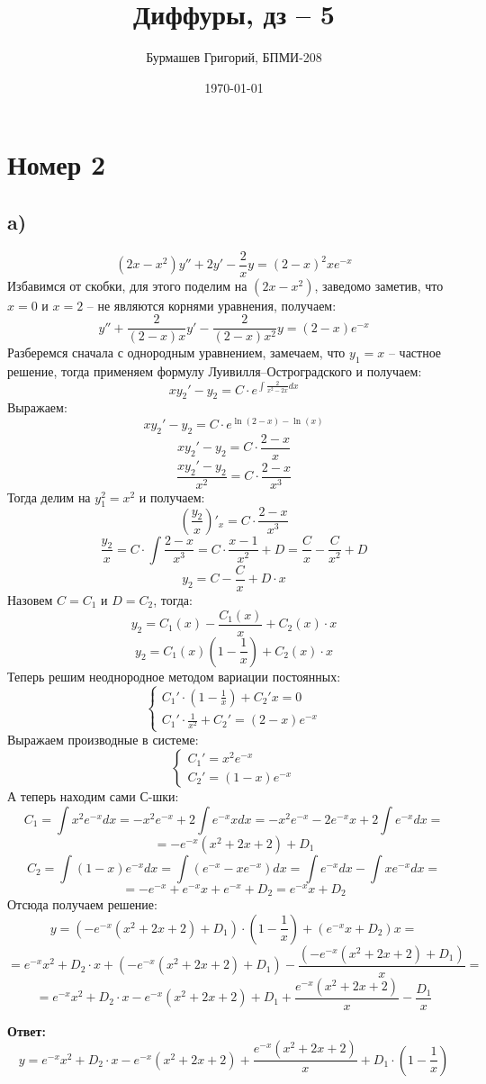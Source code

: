 \documentclass[a4paper,12pt]{article}
\author{Бурмашев Григорий, БПМИ-208}
\title{Диффуры, дз -- 5}
\date{\today}
\begin{document}
\maketitle
\section*{Номер 2}
\subsection*{a)}
\[
(2x - x^2)y'' + 2y' - \frac{2}{x}y = (2-x)^2 xe^{-x}
\]
Избавимся от скобки, для этого поделим на $(2x-x^2)$, заведомо заметив, что $x = 0$ и $x = 2$ -- не являются корнями уравнения, получаем:
\[
y'' + \frac{2}{(2-x)x} y'  - \frac{2}{(2 - x)x^2} y = (2 - x)e^{-x}
\]
Разберемся сначала с однородным уравнением, замечаем, что $y_1 = x$ -- частное решение, тогда применяем формулу Луивилля--Остроградского и получаем:
\[
xy_2' - y_2 = C \cdot e^{\int \frac{2}{x^2 - 2x}dx}
\]
Выражаем:
\[
xy_2' - y_2 = C \cdot e^{\ln(2 - x) - \ln (x)}
\]
\[
xy_2' - y_2 = C \cdot \frac{2 - x}{x}
\]
\[
\frac{xy_2' - y_2}{x^2} =C \cdot \frac{2 - x}{x^3}
\]
Тогда делим на $y_1^2 = x^2 $ и получаем:
\[
\left(
\frac{y_2}{x}
\right)'_x = C \cdot \frac{2 - x}{x^3}
\]
\[
\frac{y_2}{x} = C \cdot \int \frac{2-x}{x^3} = C \cdot \frac{x-1}{x^2} + D = \frac{C}{x} - \frac{C}{x^2} + D
\]
\[
y_2 = C - \frac{C}{x} + D \cdot x
\]
Назовем $C = C_1$ и $D = C_2$, тогда:
\[
y_2 = C_1(x) - \frac{C_1(x)}{x } +  C_2(x) \cdot x
\]
\[
y_2 = C_1(x) \left(
1 - \frac{1}{x} 
\right) + C_2(x) \cdot x
\]
Теперь решим неоднородное методом вариации постоянных:
\[
\begin{cases}
C_1' \cdot \left(
1 - \frac{1}{x}
\right)+ C_2' x = 0  \\
C_1' \cdot \frac{1}{x^2} + C_2' = (2 - x)e^{-x}
\end{cases}
\]
Выражаем производные в системе:
\[
\begin{cases} 
C_1' = x^2 e^{-x} \\
C_2' = (1 - x)e^{-x}
\end{cases}
\]
А теперь находим сами С-шки:
\[
C_1 = \int x^2 e^{-x} dx =  - x^2 e^{-x} + 2 \int e^{-x} xdx = -x^2e^{-x} - 2e^{-x} x + 2 \int e^{-x} dx = 
\]
\[
=
-e^{-x} \left(
x^2 + 2x + 2
\right) + D_1
\]
\[
C_2 = \int (1 - x) e^{-x} dx = \int (e^{-x} - x e^{-x}) dx =  \int e^{-x} dx - \int x e^{-x} dx =
\] 
\[
=
-e^{-x}  + e^{-x} x + e^{-x} + D_2 = 
e^{-x} x + D_2
\]
Отсюда получаем решение:
\[
y = \left(
-e^{-x} (x^2 + 2x +2) + D_1 
\right) \cdot \left(
 1- \frac{1}{x}
\right)
+ (e^{-x}x + D_2) x = 
\]
\[
=
e^{-x} x^2 + D_2 \cdot x +\left(
-e^{-x} (x^2 + 2x +2) + D_1 
\right) - \frac{\left(
-e^{-x} (x^2 + 2x +2) + D_1 
\right)}{x} = 
\]
\[
=
e^{-x} x^2 + D_2 \cdot x - e^{-x}(x^2 + 2x + 2) + D_1 + \frac{e^{-x}(x^2 + 2x + 2)}{x} - \frac{D_1}{x}
\]
\begin{center}
\textbf{Ответ: } 
\[
y = e^{-x} x^2 + D_2 \cdot x - e^{-x}(x^2 + 2x + 2) + \frac{e^{-x}(x^2 + 2x + 2)}{x} + D_1 \cdot \left(
1 - \frac{1}{x}
\right)
\]
\end{center}
\clearpage
\end{document}

